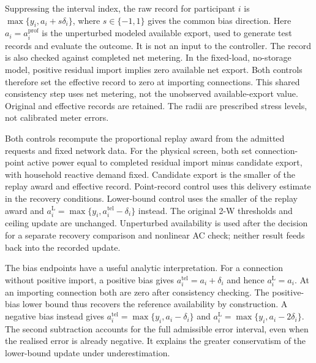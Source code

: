 \documentclass[11pt]{article}
\begin{document}
Suppressing the interval index, the raw record for participant $i$ is
$\max\{y_i,a_i+s\delta_i\}$, where $s\in\{-1,1\}$ gives the common bias direction.
Here $a_i=a_i^{\mathrm{prof}}$ is the unperturbed modeled available export, used
to generate test records and evaluate the outcome. It is not an input to the
controller. The record is also checked against completed net metering.
In the fixed-load, no-storage model, positive residual import implies zero
available net export. Both controls therefore set the effective record to zero
at importing connections. This shared consistency step uses net metering,
not the unobserved available-export value. Original and effective records are
retained. The radii are prescribed stress levels, not calibrated meter errors.

Both controls recompute the proportional replay award from the admitted
requests and fixed network data. For the physical screen, both set
connection-point active power equal to completed
residual import minus candidate export, with household reactive demand fixed.
Candidate export is the smaller of the replay award and effective record.
Point-record control uses this delivery estimate in the recovery conditions.
Lower-bound control uses the smaller of the replay award and
$a_i^{\mathrm L}=\max\{y_i,a_i^{\mathrm{tel}}-\delta_i\}$ instead. The original
2-W thresholds and ceiling update are unchanged. Unperturbed availability is
used after the decision for a separate recovery comparison and nonlinear AC
check; neither result feeds back into the recorded update.

The bias endpoints have a useful analytic interpretation. For a connection
without positive import, a positive bias gives
$a_i^{\mathrm{tel}}=a_i+\delta_i$ and hence $a_i^{\mathrm L}=a_i$.
At an importing connection both are zero after consistency checking. The
positive-bias lower bound thus recovers the reference availability by
construction. A negative bias instead gives
$a_i^{\mathrm{tel}}=\max\{y_i,a_i-\delta_i\}$ and
$a_i^{\mathrm L}=\max\{y_i,a_i-2\delta_i\}$.
The second subtraction accounts for the full admissible error interval, even
when the realised error is already negative. It explains the greater
conservatism of the lower-bound update under underestimation.
\end{document}
